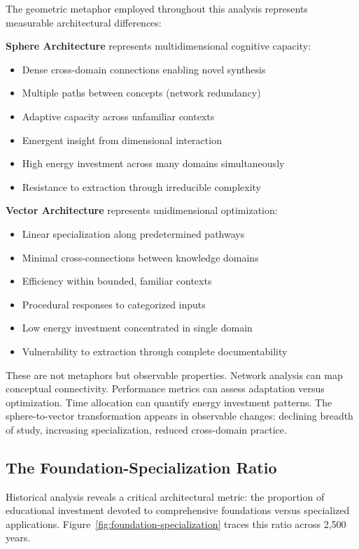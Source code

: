 The geometric metaphor employed throughout this analysis represents measurable architectural differences:

\textbf{Sphere Architecture} represents multidimensional cognitive capacity:
\begin{itemize}
    \item Dense cross-domain connections enabling novel synthesis
    \item Multiple paths between concepts (network redundancy)
    \item Adaptive capacity across unfamiliar contexts
    \item Emergent insight from dimensional interaction
    \item High energy investment across many domains simultaneously
    \item Resistance to extraction through irreducible complexity
\end{itemize}

\textbf{Vector Architecture} represents unidimensional optimization:
\begin{itemize}
    \item Linear specialization along predetermined pathways
    \item Minimal cross-connections between knowledge domains
    \item Efficiency within bounded, familiar contexts
    \item Procedural responses to categorized inputs
    \item Low energy investment concentrated in single domain
    \item Vulnerability to extraction through complete documentability
\end{itemize}

These are not metaphors but observable properties. Network analysis can map conceptual connectivity. Performance metrics can assess adaptation versus optimization. Time allocation can quantify energy investment patterns. The sphere-to-vector transformation appears in observable changes: declining breadth of study, increasing specialization, reduced cross-domain practice.

\subsection{The Foundation-Specialization Ratio}

Historical analysis reveals a critical architectural metric: the proportion of educational investment devoted to comprehensive foundations versus specialized applications. Figure~\ref{fig:foundation-specialization} traces this ratio across 2,500 years.

